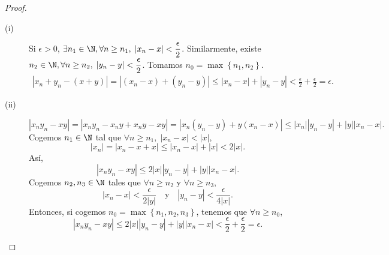 \begin{proof}
\begin{description}
	\item[(i)] Si $\displaystyle \epsilon > 0 $, $\displaystyle \exists n_{1} \in \N, \forall n \geq n_{1}, \; \left|x_{n}-x\right|<\frac{\epsilon }{2} $. Similarmente, existe $\displaystyle n_{2}\in\N, \forall n \geq n_{2}, \; \left|y_{n}-y\right|< \frac{\epsilon }{2} $. Tomamos $\displaystyle n_{0} = \max \left\{ n_{1}, n_{2}\right\}  $. 
\[
\begin{split}
 \left|x_{n}+y_{n} - \left(x+ y\right)\right| = \left|\left(x_{n}-x\right) + \left(y_{n}-y\right)\right| \leq \left|x_{n}-x\right| + \left|y_{n}-y\right| < \frac{\epsilon }{2} + \frac{\epsilon }{2} = \epsilon .
\end{split}
\]
\item[(ii)] 
	\[ \left|x_{n}y_{n} - xy\right| = \left|x_{n}y_{n} - x_{n}y + x_{n}y - xy\right| = \left|x_{n}\left(y_{n}-y\right) + y \left(x_{n}-x\right)\right| \leq \left|x_{n}\right| \left|y_{n}-y\right| + \left|y\right| \left|x_{n}-x\right| .\]
Cogemos $\displaystyle n_{1} \in \N $ tal que $\displaystyle \forall n \geq n_{1}, \; \left|x_{n}-x\right| < \left|x\right| $,
\[ \left|x_{n}\right| = \left|x_{n} - x + x\right| \leq \left|x_{n}-x\right| + \left|x\right| < 2 \left|x\right| .\]
Así, 
\[ \left|x_{n}y_{n} - xy\right| \leq 2 \left|x\right| \left|y_{n}-y\right| + \left|y\right| \left|x_{n}-x\right|.\]
Cogemos $\displaystyle n_{2}, n_{3} \in \N $ tales que $\displaystyle \forall n \geq n_{2} $ y $\displaystyle \forall n \geq n_{3} $, 
\[ \left|x_{n}-x\right| < \frac{ \epsilon}{2 \left|y\right| } \quad \text{y} \quad \left|y_{n}-y\right|<\frac{\epsilon }{4 \left|x\right|} .\]
Entonces, si cogemos $\displaystyle n_{0} = \max \left\{ n_{1}, n_{2}, n_{3}\right\}  $, tenemos que $\displaystyle \forall n \geq n_{0} $, 
\[ \left|x_{n}y_{n} - xy\right| \leq 2 \left|x\right| \left|y_{n}-y\right| + \left|y\right| \left|x_{n}-x\right| < \frac{\epsilon }{2} + \frac{\epsilon }{2 }=\epsilon  .\]


\end{description}
\end{proof}

